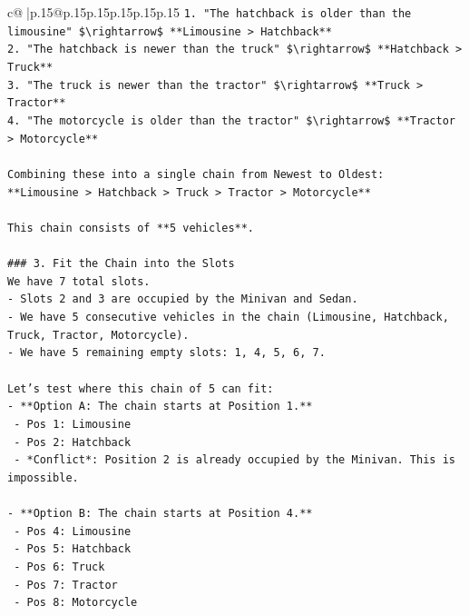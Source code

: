 \documentclass{article}
\begin{document}
{\begin{supertabular}{c@{$\;$}|p{.15\linewidth}@{}p{.15\linewidth}p{.15\linewidth}p{.15\linewidth}p{.15\linewidth}p{.15\linewidth}}
{{{\texttt{1. "The hatchback is older than the limousine" \$\textbackslash{}rightarrow\$ **Limousine > Hatchback**} \\
\texttt{2. "The hatchback is newer than the truck" \$\textbackslash{}rightarrow\$ **Hatchback > Truck**} \\
\texttt{3. "The truck is newer than the tractor" \$\textbackslash{}rightarrow\$ **Truck > Tractor**} \\
\texttt{4. "The motorcycle is older than the tractor" \$\textbackslash{}rightarrow\$ **Tractor > Motorcycle**} \\
\\ 
\texttt{Combining these into a single chain from Newest to Oldest:} \\
\texttt{**Limousine > Hatchback > Truck > Tractor > Motorcycle**} \\
\\ 
\texttt{This chain consists of **5 vehicles**.} \\
\\ 
\texttt{\#\#\# 3. Fit the Chain into the Slots} \\
\texttt{We have 7 total slots.} \\
\texttt{{-} Slots 2 and 3 are occupied by the Minivan and Sedan.} \\
\texttt{{-} We have 5 consecutive vehicles in the chain (Limousine, Hatchback, Truck, Tractor, Motorcycle).} \\
\texttt{{-} We have 5 remaining empty slots: 1, 4, 5, 6, 7.} \\
\\ 
\texttt{Let's test where this chain of 5 can fit:} \\
\texttt{{-} **Option A: The chain starts at Position 1.**} \\
\texttt{  {-} Pos 1: Limousine} \\
\texttt{  {-} Pos 2: Hatchback} \\
\texttt{  {-} *Conflict*: Position 2 is already occupied by the Minivan. This is impossible.} \\
\\ 
\texttt{{-} **Option B: The chain starts at Position 4.**} \\
\texttt{  {-} Pos 4: Limousine} \\
\texttt{  {-} Pos 5: Hatchback} \\
\texttt{  {-} Pos 6: Truck} \\
\texttt{  {-} Pos 7: Tractor} \\
\texttt{  {-} Pos 8: Motorcycle} \\
}}}
\end{supertabular}}
\end{document}
